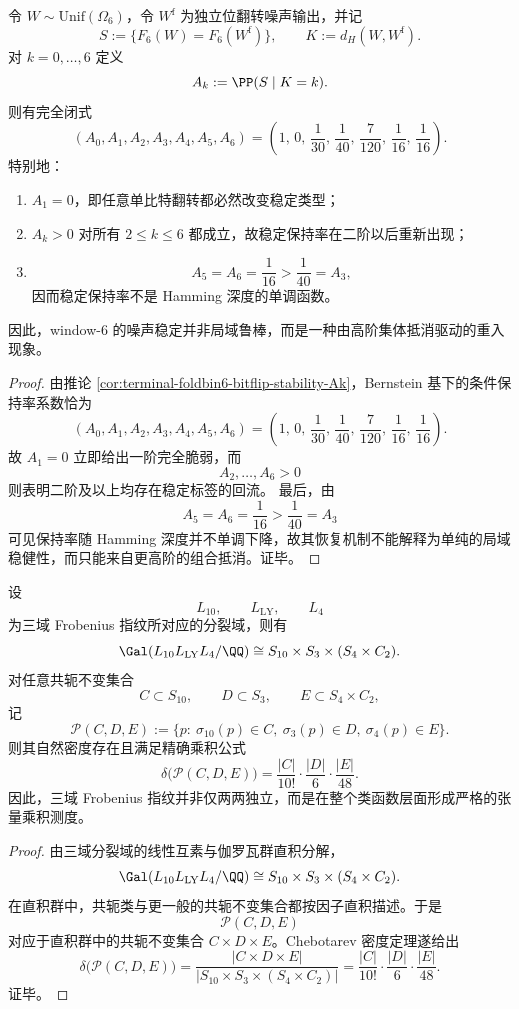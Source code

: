 \begin{theorem}\label{thm:conclusion-window6-noise-local-fragility-high-order-return}
令 \(W\sim \mathrm{Unif}(\Omega_6)\)，令 \(W^{\mathrm f}\) 为独立位翻转噪声输出，并记
\[
S:=\{F_6(W)=F_6(W^{\mathrm f})\},
\qquad
K:=d_H(W,W^{\mathrm f}).
\]
对 \(k=0,\dots,6\) 定义
\[
A_k:=\PP(S\mid K=k).
\]
则有完全闭式
\[
(A_0,A_1,A_2,A_3,A_4,A_5,A_6)
=
\left(
1,\,
0,\,
\frac1{30},\,
\frac1{40},\,
\frac7{120},\,
\frac1{16},\,
\frac1{16}
\right).
\]
特别地：
\begin{enumerate}
\normalfont
  \item \(A_1=0\)，即任意单比特翻转都必然改变稳定类型；
  \item \(A_k>0\) 对所有 \(2\le k\le 6\) 都成立，故稳定保持率在二阶以后重新出现；
  \item
  \[
  A_5=A_6=\frac1{16}>\frac1{40}=A_3,
  \]
  因而稳定保持率不是 Hamming 深度的单调函数。
\end{enumerate}
因此，window-\(6\) 的噪声稳定并非局域鲁棒，而是一种由高阶集体抵消驱动的重入现象。
\end{theorem}
\begin{proof}
由推论 \ref{cor:terminal-foldbin6-bitflip-stability-Ak}，Bernstein 基下的条件保持率系数恰为
\[
(A_0,A_1,A_2,A_3,A_4,A_5,A_6)
=
\left(
1,\,
0,\,
\frac1{30},\,
\frac1{40},\,
\frac7{120},\,
\frac1{16},\,
\frac1{16}
\right).
\]
故 \(A_1=0\) 立即给出一阶完全脆弱，而
\[
A_2,\dots,A_6>0
\]
则表明二阶及以上均存在稳定标签的回流。
最后，由
\[
A_5=A_6=\frac1{16}>\frac1{40}=A_3
\]
可见保持率随 Hamming 深度并不单调下降，故其恢复机制不能解释为单纯的局域稳健性，而只能来自更高阶的组合抵消。证毕。
\end{proof}

\begin{theorem}\label{thm:conclusion-leyang-three-domain-frobenius-tensor-density}
设
\[
L_{10},\qquad L_{\mathrm{LY}},\qquad L_4
\]
为三域 Frobenius 指纹所对应的分裂域，则有
\[
\Gal(L_{10}L_{\mathrm{LY}}L_4/\QQ)
\cong
S_{10}\times S_3\times (S_4\times C_2).
\]
对任意共轭不变集合
\[
C\subset S_{10},\qquad D\subset S_3,\qquad E\subset S_4\times C_2,
\]
记
\[
\mathcal P(C,D,E)
:=
\{p:\ \sigma_{10}(p)\in C,\ \sigma_3(p)\in D,\ \sigma_4(p)\in E\}.
\]
则其自然密度存在且满足精确乘积公式
\[
\delta\bigl(\mathcal P(C,D,E)\bigr)
=
\frac{|C|}{10!}\cdot\frac{|D|}{6}\cdot\frac{|E|}{48}.
\]
因此，三域 Frobenius 指纹并非仅两两独立，而是在整个类函数层面形成严格的张量乘积测度。
\end{theorem}
\begin{proof}
由三域分裂域的线性互素与伽罗瓦群直积分解，
\[
\Gal(L_{10}L_{\mathrm{LY}}L_4/\QQ)
\cong
S_{10}\times S_3\times (S_4\times C_2).
\]
在直积群中，共轭类与更一般的共轭不变集合都按因子直积描述。于是
\[
\mathcal P(C,D,E)
\]
对应于直积群中的共轭不变集合 \(C\times D\times E\)。Chebotarev 密度定理遂给出
\[
\delta\bigl(\mathcal P(C,D,E)\bigr)
=
\frac{|C\times D\times E|}{|S_{10}\times S_3\times (S_4\times C_2)|}
=
\frac{|C|}{10!}\cdot\frac{|D|}{6}\cdot\frac{|E|}{48}.
\]
证毕。
\end{proof}

